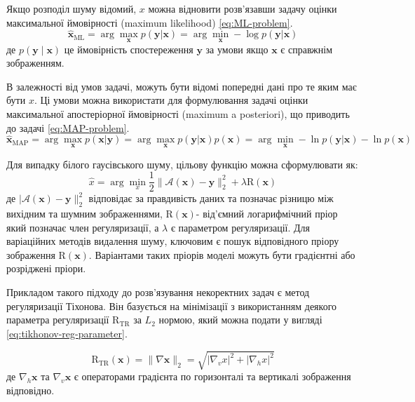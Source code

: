 \documentclass[14pt,a4paper]{extarticle}
\newcounter{e}
\numberwithin{equation}{section}
\numberwithin{figure}{section}
\begin{document}
	Якщо розподіл шуму відомий, $x$ можна відновити розв'язавши задачу оцінки максимальної ймовірності (maximum likelihood) \ref{eq:ML-problem}.
	\begin{equation}
		\label{eq:ML-problem}
		\hat{\boldsymbol{x}}_{\mathrm{ML}}
		= \arg \max_{\boldsymbol{x}} {p (\boldsymbol{y} | \boldsymbol{x})}
		= \arg \min_{\boldsymbol{x}} -\log p(\boldsymbol{y} | \boldsymbol{x})
	\end{equation}
	де $p(\boldsymbol{y} \mid \boldsymbol{x})$ це ймовірність спостереження $\boldsymbol{y}$ за умови якщо $\boldsymbol{x}$ є справжнім зображенням.
	
	В залежності від умов задачі, можуть бути відомі попередні дані про те яким має бути $x$. Ці умови можна використати для формулювання задачі оцінки максимальної апостеріорної ймовірності (maximum a posteriori), що приводить до задачі \ref{eq:MAP-problem}.
	\begin{equation}
		\label{eq:MAP-problem}
		\hat{\boldsymbol{x}}_{\mathrm{MAP}}
		=
		\arg \max_{\boldsymbol{x}} p(\boldsymbol{x} | \boldsymbol{y}) 
		=
		\arg \max_{\boldsymbol{x}} {p(\boldsymbol{y} | \boldsymbol{x})} p(\boldsymbol{x})
		=
		\arg \min_{\boldsymbol{x}} -\ln p(\boldsymbol{y} | \boldsymbol{x})-\ln p(\boldsymbol{x})
	\end{equation}
	
	Для випадку білого гаусівського шуму, цільову функцію можна сформулювати як:
	\begin{equation}
		\label{eq:MAP-avgn}
		\hat{x}=\arg \min_{x} 	\frac{1}{2}\|\mathcal{A}(\boldsymbol{x})-\boldsymbol{y}\|_{2}^{2}+\lambda \mathrm{R}(\boldsymbol{x})
	\end{equation}
	де  $|\mathcal{A}(\boldsymbol{x})-\boldsymbol{y}\|_{2}^{2}$ відповідає за правдивість даних та позначає різницю між вихідним та шумним зображеннями, $\mathrm{R}(\boldsymbol{x})$- від'ємний логарифмічний пріор який позначає член регуляризації, а $\lambda$ є параметром регуляризації. Для варіаційних методів видалення шуму, ключовим є пошук відповідного пріору зображення $\mathrm{R}(\boldsymbol{x})$. Варіантами таких пріорів моделі можуть бути градієнтні або розріджені пріори.

	Прикладом такого підходу до розв'язування некоректних задач є метод регуляризації Тіхонова. Він базується на мінімізації з використанням деякого параметра регуляризації $\mathrm{R}_{\mathrm{TR}}$ за $L_2$ нормою, який можна подати у вигляді \ref{eq:tikhonov-reg-parameter}.
	
	\begin{equation}
		\label{eq:tikhonov-reg-parameter}
		\mathrm{R}_{\mathrm{TR}}(\boldsymbol{x})
		=
		\|\nabla \boldsymbol{x}\|_{2} 
		=
		\sqrt{\left|\nabla_{v} x\right|^{2}+\left|\nabla_{h} x\right|^{2}}
	\end{equation}
	де $\nabla_{h} \boldsymbol{x}$ та $\nabla_{v} \boldsymbol{x}$ є операторами градієнта по горизонталі та вертикалі зображення відповідно.
	
\end{document}
